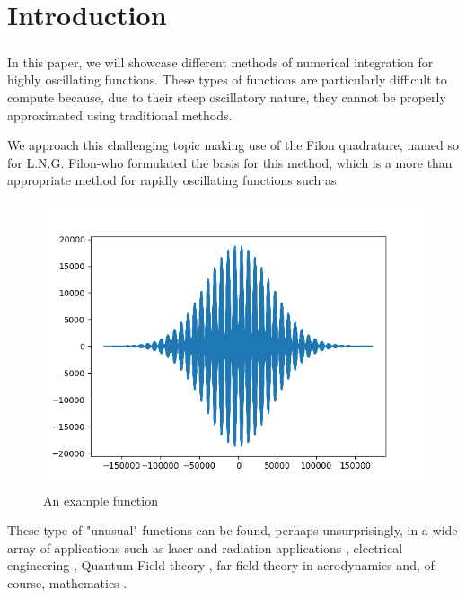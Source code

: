 \chapter{Introduction}

\indent

\paragraph{} In this paper, we will showcase different methods of numerical integration for highly oscillating functions. These types of functions are particularly difficult to compute because, due to their steep oscillatory nature, they cannot be properly approximated using traditional methods.

\vspace{0.25in}

We approach this challenging topic making use of the Filon quadrature, named so for L.N.G. Filon-who formulated the basis for this method\cite{lng}, which is a more than appropriate method for rapidly oscillating functions such as

\begin{figure}[h]
    \centering
    \includegraphics[scale=0.7]{c1/Figure_1.png}
    \caption{An example function}
    \label{figExample}
\end{figure}

These type of "unusual" functions can be found, perhaps unsurprisingly, in a wide array of applications such as laser and radiation applications \cite{book1}, electrical engineering \cite{circ} \cite{circ2}, Quantum Field theory \cite{world}, far-field theory in aerodynamics\cite{aer} and, of course, mathematics\cite{rules} \cite{fcc} \cite{comp}. 

